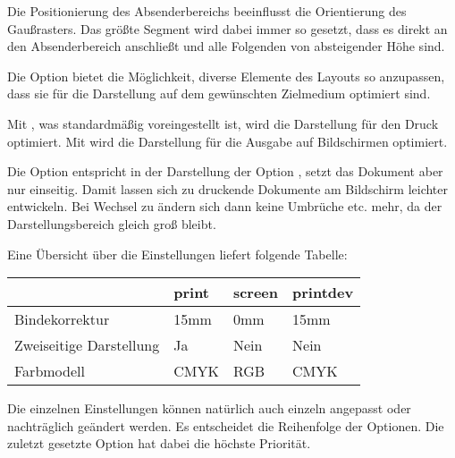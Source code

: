 \begin{important}
  Die Positionierung des Absenderbereichs beeinflusst die Orientierung des
  Gaußrasters. Das größte Segment wird dabei immer so gesetzt, dass es direkt
  an den Absenderbereich anschließt und alle Folgenden von absteigender Höhe sind.
\end{important}


\begin{Declaration}
\end{Declaration}

Die Option  bietet die Möglichkeit, diverse Elemente
des Layouts so anzupassen, dass sie für die Darstellung auf dem gewünschten
Zielmedium optimiert sind.

Mit , was standardmäßig voreingestellt ist,
wird die Darstellung für den Druck optimiert.
Mit  wird die Darstellung
für die Ausgabe auf Bildschirmen optimiert.

Die Option  entspricht in der Darstellung
der Option , setzt das Dokument aber nur einseitig.
Damit lassen sich zu druckende Dokumente am Bildschirm leichter entwickeln.
Bei Wechsel zu  ändern sich dann keine Umbrüche etc.
mehr, da der Darstellungsbereich gleich groß bleibt.

Eine Übersicht über die Einstellungen liefert folgende Tabelle:

\begin{center}
\begin{tabular}{llll}
  & \textbf{\ttfamily print} & \textbf{\ttfamily screen} & \textbf{\ttfamily printdev} \\
  \midrule
Bindekorrektur          & 15mm  & 0mm   & 15mm\\
Zweiseitige Darstellung & Ja    & Nein  & Nein\\
Farbmodell              & CMYK  & RGB   & CMYK
\end{tabular}
\end{center}

Die einzelnen Einstellungen können natürlich auch einzeln angepasst oder
nachträglich geändert werden. Es entscheidet die Reihenfolge der Optionen.
Die zuletzt gesetzte Option hat dabei die höchste Priorität.

\begin{Declaration}
  \\
\end{Declaration}

